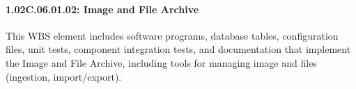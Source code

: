 \paragraph{1.02C.06.01.02: Image and File Archive}

This WBS element includes software programs, database tables, configuration files, unit tests, component integration tests, and documentation that implement the Image and File Archive, including tools for managing image and files (ingestion, import/export).

